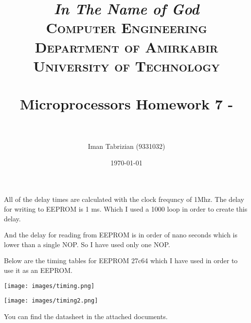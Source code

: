 \documentclass[paper=a4, fontsize=11pt]{scrartcl} %
\title{
\normalfont \normalsize
\textit{In The Name of God} \\ \textsc{Computer Engineering Department of Amirkabir University of Technology} \\ [25pt] \horrule{0.5pt} \\[0.4cm] %
\huge Microprocessors Homework 7 -  \\ %
\horrule{2pt} \\[0.5cm] %
}
\author{Iman Tabrizian (9331032)}
\date{\normalsize\today}
\numberwithin{equation}{section} %
\numberwithin{figure}{section} %
\numberwithin{table}{section} %
\begin{document}
\maketitle
\par All of the delay times are calculated with the clock frequncy of 1Mhz.
The delay for writing to EEPROM is 1 ms. Which I used a 1000 loop in order to
create this delay.

And the delay for reading from EEPROM is in order of nano seconds which is
lower than a single NOP. So I have used only one NOP.

Below are the timing tables for EEPROM 27c64 which I have used in order to
use it as an EEPROM.

\texttt{[image: images/timing.png]}

\texttt{[image: images/timing2.png]}

You can find the datasheet in the attached documents.
\end{document}
